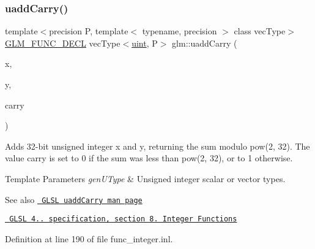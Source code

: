 \subsubsection{\texorpdfstring{uaddCarry()}{uaddCarry()}}
{\footnotesize\ttfamily template$<$precision P, template$<$ typename, precision $>$ class vec\+Type$>$ \\
\mbox{\hyperlink{setup_8hpp_ab2d052de21a70539923e9bcbf6e83a51}{G\+L\+M\+\_\+\+F\+U\+N\+C\+\_\+\+D\+E\+CL}} vec\+Type$<$\mbox{\hyperlink{group__core__precision_ga4fd29415871152bfb5abd588334147c8}{uint}}, P$>$ glm\+::uadd\+Carry (\begin{DoxyParamCaption}\item[{vec\+Type$<$ \mbox{\hyperlink{group__core__precision_ga4fd29415871152bfb5abd588334147c8}{uint}}, P $>$ const \&}]{x,  }\item[{vec\+Type$<$ \mbox{\hyperlink{group__core__precision_ga4fd29415871152bfb5abd588334147c8}{uint}}, P $>$ const \&}]{y,  }\item[{vec\+Type$<$ \mbox{\hyperlink{group__core__precision_ga4fd29415871152bfb5abd588334147c8}{uint}}, P $>$ \&}]{carry }\end{DoxyParamCaption})}

Adds 32-\/bit unsigned integer x and y, returning the sum modulo pow(2, 32). The value carry is set to 0 if the sum was less than pow(2, 32), or to 1 otherwise.


\begin{DoxyTemplParams}{Template Parameters}
{\em gen\+U\+Type} & Unsigned integer scalar or vector types.\\
\hline
\end{DoxyTemplParams}
\begin{DoxySeeAlso}{See also}
\href{http://www.opengl.org/sdk/docs/manglsl/xhtml/uaddCarry.xml}{\texttt{ G\+L\+SL uadd\+Carry man page}} 

\href{http://www.opengl.org/registry/doc/GLSLangSpec.4.20.8.pdf}{\texttt{ G\+L\+SL 4.. specification, section 8. Integer Functions}} 
\end{DoxySeeAlso}


Definition at line 190 of file func\+\_\+integer.\+inl.

\mbox{\label{group__core__func__integer_ga456ff9dcec42f6769a9ae2a2af7f1ce1}} 
